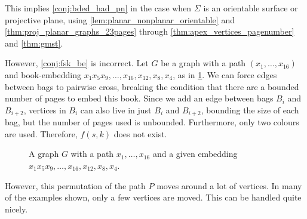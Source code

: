 This implies \cref{conj:bded_had_pn} in the case when $\Sigma$ is an orientable surface or projective plane, using \cref{lem:planar_nonplanar_orientable} and \cref{thm:proj_planar_graphs_23pages} through \cref{thm:apex_vertices_pagenumber} and \cref{thm:gmst}. 

However, \cref{conj:fsk_be} is incorrect. Let $G$ be a graph with a path $(x_1, \ldots, x_{16})$ and book-embedding $x_1 x_5 x_9, \ldots, x_{16}, x_{12}, x_{8}, x_{4}$, as in \cref{fig:counterexample_2}. We can force edges between bags to pairwise cross, breaking the condition that there are a bounded number of pages to embed this book. Since we add an edge between bags $B_i$ and $B_{i + 2}$, vertices in $B_i$ can also live in just $B_i$ and $B_{i + 2}$, bounding the size of each bag, but the number of pages used is unbounded. Furthermore, only two colours are used. Therefore, $f(s, k)$ does not exist.

\begin{figure}[h!]
	\centering
	
	\caption[Counterexample to bounded number of colours]{A graph $G$ with a path $x_1, \ldots, x_{16}$ and a given embedding $x_1 x_5 x_9, \ldots, x_{16}, x_{12}, x_{8}, x_{4}$. }\label{fig:counterexample_2}
\end{figure}

However, this permutation of the path $P$ moves around a lot of vertices. In many of the examples shown, only a few vertices are moved. This can be handled quite nicely. 